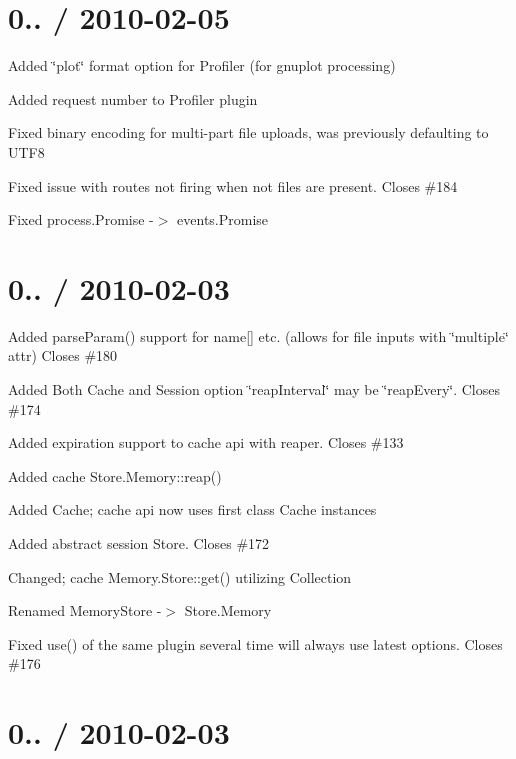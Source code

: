 {\ttfamily \section*{0.. / 2010-\/02-\/05 }}

{\ttfamily }

{\ttfamily 
\begin{DoxyItemize}
\item Added \char`\"{}plot\char`\"{} format option for Profiler (for gnuplot processing)
\item Added request number to Profiler plugin
\item Fixed binary encoding for multi-\/part file uploads, was previously defaulting to U\+T\+F8
\item Fixed issue with routes not firing when not files are present. Closes \#184
\item Fixed process.\+Promise -\/$>$ events.\+Promise
\end{DoxyItemize}}

{\ttfamily \section*{0.. / 2010-\/02-\/03 }}

{\ttfamily }

{\ttfamily 
\begin{DoxyItemize}
\item Added parse\+Param() support for name\mbox{[}\mbox{]} etc. (allows for file inputs with \char`\"{}multiple\char`\"{} attr) Closes \#180
\item Added Both Cache and Session option \char`\"{}reap\+Interval\char`\"{} may be \char`\"{}reap\+Every\char`\"{}. Closes \#174
\item Added expiration support to cache api with reaper. Closes \#133
\item Added cache Store.\+Memory\+::reap()
\item Added Cache; cache api now uses first class Cache instances
\item Added abstract session Store. Closes \#172
\item Changed; cache Memory.\+Store\+::get() utilizing Collection
\item Renamed Memory\+Store -\/$>$ Store.\+Memory
\item Fixed use() of the same plugin several time will always use latest options. Closes \#176
\end{DoxyItemize}}

{\ttfamily \section*{0.. / 2010-\/02-\/03 }}

